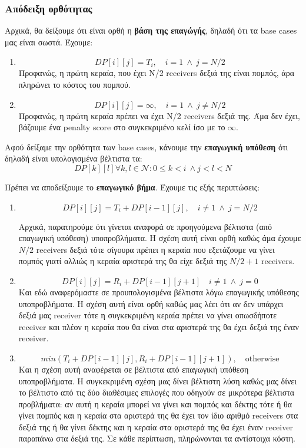 \documentclass[a4paper,oneside, 11pt]{article}
\begin{document}
\subsubsection*{Απόδειξη ορθότητας}
Αρχικά, θα δείξουμε ότι είναι ορθή η \textbf{βάση της επαγώγής}, δηλαδή ότι τα base cases μας είναι σωστά. Έχουμε:
\begin{enumerate}
	\item $$DP[i][j]= T_i, \quad i=1 \ \wedge \ j = N/2$$
	Προφανώς, η πρώτη κεραία, που έχει N/2 receivers δεξιά της είναι πομπός, άρα πληρώνει το κόστος του πομπού. 
	\item $$DP[i][j] = \infty, \quad i= 1 \ \wedge \ j\neq N/2$$
	Προφανώς, η πρώτη κεραία πρέπει να έχει N/2 receivers δεξιά της. Άμα δεν έχει, βάζουμε ένα penalty score στο συγκεκριμένο κελί ίσο με το $\infty$.
	
\end{enumerate}

Αφού δείξαμε την ορθότητα των base cases, κάνουμε την \textbf{επαγωγική υπόθεση} ότι δηλαδή είναι υπολογισμένα βέλτιστα τα:
$$DP[k][l] \forall k,l \in \mathcal{N}: 0\leq k < i \ \wedge j < l < N$$


\bigbreak 

Πρέπει να αποδείξουμε το \textbf{επαγωγικό βήμα}. Έχουμε τις εξής περιπτώσεις:
\begin{enumerate}
	\item $$DP[i][j]=T_i + DP[i-1][j], \quad i\neq 1 \ \wedge \ j=N/2$$ \bigbreak 
	
	Αρχικά, παρατηρούμε ότι γίνεται αναφορά σε προηγούμενα βέλτιστα (από επαγωγική υπόθεση) υποπροβλήματα. Η σχέση αυτή είναι ορθή καθώς άμα έχουμε $N/2$ receivers δεξιά τότε σίγουρα πρέπει η κεραία που εξετάζουμε να γίνει πομπός γιατί αλλιώς η κεραία αριστερά της θα είχε δεξιά της $N/2+1$ receivers.
	
	\item $$DP[i][j]=R_i + DP[i-1][j+1] \quad i\neq 1 \ \wedge \ j=0$$
	Και εδώ αναφερόμαστε σε προυπολογισμένα βέλτιστα λόγω επαγωγικής υπόθεσης υποπροβλήματα. Η σχέση αυτή είναι ορθή καθώς μας λέει ότι αν δεν υπάρχει δεξιά μας receiver τότε η συγκεκριμένη κεραία πρέπει να γίνει οπωσδήποτε receiver και πλέον η κεραία που θα είναι στα αριστερά της θα έχει δεξιά της έναν receiver.
	
	\item $$min\left( T_i + DP[i-1][j], R_i + DP[i-1][j+1]\right), \quad \textrm{otherwise}$$
	Και η σχέση αυτή αναφέρεται σε βέλτιστα από επαγωγική υπόθεση υποπροβλήματα. Η συγκεκριμένη σχέση μας δίνει βέλτιστη λύση καθώς μας δίνει το βέλτιστο από τις δύο διαθέσιμες επιλογές που οδηγούν σε μικρότερα βέλτιστα προβλήματα: αν αυτή η κεραία μπορεί να γίνει και πομπός και δέκτης τότε ή θα γίνει πομπός και η κεραία στα αριστερά της θα έχει τον ίδιο αριθμό receivers στα δεξιά της ή θα γίνει δέκτης και η κεραία στα αριστερά της θα έχει έναν receiver παραπάνω στα δεξιά της. Σε κάθε περίπτωση, πληρώνονται τα αντίστοιχα κόστη.
\end{enumerate}
\end{document}
